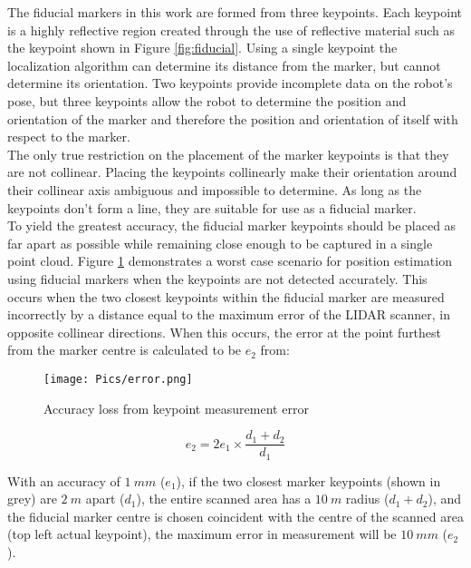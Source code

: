 The fiducial markers in this work are formed from three keypoints. Each keypoint is a highly reflective region created through the use of reflective material such as the keypoint shown in Figure \ref{fig:fiducial}. Using a single keypoint the localization algorithm can determine its distance from the marker, but cannot determine its orientation. Two keypoints provide incomplete data on the robot's pose, but three keypoints allow the robot to determine the position and orientation of the marker and therefore the position and orientation of itself with respect to the marker.\\

The only true restriction on the placement of the marker keypoints is that they are not collinear. Placing the keypoints collinearly make their orientation around their collinear axis ambiguous and impossible to determine. As long as the keypoints don't form a line, they are suitable for use as a fiducial marker.\\

To yield the greatest accuracy, the fiducial marker keypoints should be placed as far apart as possible while remaining close enough to be captured in a single point cloud. Figure \ref{fig:resacc} demonstrates a worst case scenario for position estimation using fiducial markers when the keypoints are not detected accurately. This occurs when the two closest keypoints within the fiducial marker are measured incorrectly by a distance equal to the maximum error of the LIDAR scanner, in opposite collinear directions. When this occurs, the error at the point furthest from the marker centre is calculated to be $e_2$ from:

\begin{figure}
\texttt{[image: Pics/error.png]}
\caption{Accuracy loss from keypoint measurement error}
\label{fig:resacc} 
\end{figure}

\begin{equation}
   e_2 = 2e_1\times\frac{d_1+d_2}{d_1}\label{eq:2}
\end{equation}

With an accuracy of $1\ mm$ ($e_1$), if the two closest marker keypoints (shown in grey) are $2\ m$ apart ($d_1$), the entire scanned area has a $10\ m$ radius ($d_1+d_2$), and the fiducial marker centre is chosen coincident with the centre of the scanned area (top left actual keypoint), the maximum error in measurement will be $10\ mm$ ($e_2$).\\

